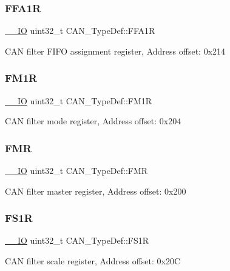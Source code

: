 \subsubsection{\texorpdfstring{FFA1R}{FFA1R}}
{\footnotesize\ttfamily \mbox{\hyperlink{core__sc300_8h_aec43007d9998a0a0e01faede4133d6be}{\+\_\+\+\_\+\+IO}} uint32\+\_\+t C\+A\+N\+\_\+\+Type\+Def\+::\+F\+F\+A1R}

C\+AN filter F\+I\+FO assignment register, Address offset\+: 0x214 \mbox{\label{struct_c_a_n___type_def_aefe6a26ee25947b7eb5be9d485f4d3b0}} 
\subsubsection{\texorpdfstring{FM1R}{FM1R}}
{\footnotesize\ttfamily \mbox{\hyperlink{core__sc300_8h_aec43007d9998a0a0e01faede4133d6be}{\+\_\+\+\_\+\+IO}} uint32\+\_\+t C\+A\+N\+\_\+\+Type\+Def\+::\+F\+M1R}

C\+AN filter mode register, Address offset\+: 0x204 \mbox{\label{struct_c_a_n___type_def_a1a6a0f78ca703a63bb0a6b6f231f612f}} 
\subsubsection{\texorpdfstring{FMR}{FMR}}
{\footnotesize\ttfamily \mbox{\hyperlink{core__sc300_8h_aec43007d9998a0a0e01faede4133d6be}{\+\_\+\+\_\+\+IO}} uint32\+\_\+t C\+A\+N\+\_\+\+Type\+Def\+::\+F\+MR}

C\+AN filter master register, Address offset\+: 0x200 \mbox{\label{struct_c_a_n___type_def_ac6296402924b37966c67ccf14a381976}} 
\subsubsection{\texorpdfstring{FS1R}{FS1R}}
{\footnotesize\ttfamily \mbox{\hyperlink{core__sc300_8h_aec43007d9998a0a0e01faede4133d6be}{\+\_\+\+\_\+\+IO}} uint32\+\_\+t C\+A\+N\+\_\+\+Type\+Def\+::\+F\+S1R}

C\+AN filter scale register, Address offset\+: 0x20C \mbox{\label{struct_c_a_n___type_def_a530babbc4b9584c93a1bf87d6ce8b8dc}} 
